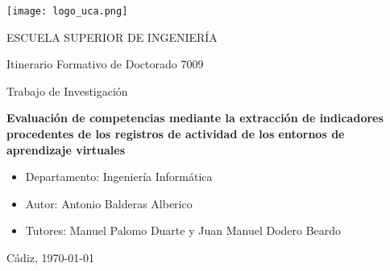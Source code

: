 

\begin{center}

  \texttt{[image: logo\_uca.png]} \\

  \vspace{2.0cm}

  \Large{ESCUELA SUPERIOR DE INGENIERÍA} \\

  \vspace{1.0cm}

  \large{Itinerario Formativo de Doctorado 7009} \\

  \vspace{2.0cm}

  \large{Trabajo de Investigación} \\

  \vspace{1.0cm}

  \Large{\textbf{Evaluación de competencias mediante la extracción de indicadores procedentes de los registros de actividad de los entornos de aprendizaje virtuales}} \\
    
  \vspace{3.0cm}

\end{center}

\begin{itemize}
\item \large{Departamento: Ingeniería Informática}
\item \large{Autor: Antonio Balderas Alberico}
\item \large{Tutores: Manuel Palomo Duarte y Juan Manuel Dodero Beardo}
\end{itemize}

\vspace{1.0cm}

\begin{flushright}
  \large{Cádiz, \today} \\

\end{flushright}
